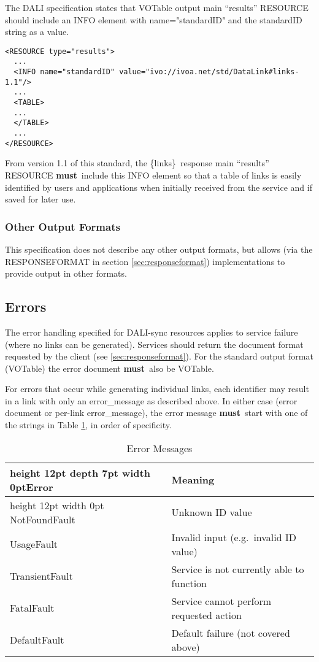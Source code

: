 \documentclass[11pt,a4paper]{ivoa}
\newcommand{\blinks}{\{links\}}
\newcommand{\attval}[2]{#1={\allowbreak}{"}#2{"}}
\newcommand{\rfcmust}{\textbf{must}}
\begin{document}
The DALI specification states that VOTable output main ``results'' RESOURCE should include an
INFO element with \attval{name}{standardID} and the standardID string as a value.
\begin{verbatim}
<RESOURCE type="results">
  ...
  <INFO name="standardID" value="ivo://ivoa.net/std/DataLink#links-1.1"/>
  ...
  <TABLE>
  ...
  </TABLE>
  ...
</RESOURCE>
\end{verbatim}
From version 1.1 of this standard, the \blinks\ response main ``results'' RESOURCE \rfcmust\ include this
INFO element so that a table of links is easily identified by users and applications
when initially received from the service and if saved for later use.

\subsubsection{Other Output Formats}

This specification does not describe any other output formats, but allows
(via the RESPONSEFORMAT in section \ref{sec:responseformat})
implementations to provide
output in other formats.


\subsection{Errors}

The error handling specified for DALI-sync resources applies
to service failure (where no links can be generated).
Services should return the
document format requested by the client (see \ref{sec:responseformat}).
For the standard
output format (VOTable) the error document \rfcmust\ also be VOTable.

For errors that occur while generating individual links, each
identifier may result in a link with only an error\_message
as described above.
In either case (error document or per-link error\_message),
the error message \rfcmust\ start with one of the strings in
Table \ref{tab:errors}, in order of specificity.
\begin{table}[ht]
\begin{center}
\begin{tabular}{|l|l|}
\hline
\vrule height 12pt depth 7pt width 0pt{\bf Error} & {\bf Meaning} \\
\hline
\vrule height 12pt width 0pt  NotFoundFault  & Unknown ID value    \\
UsageFault     & Invalid input (e.g.\ invalid ID value) \\
TransientFault & Service is not currently able to function \\
FatalFault     & Service cannot perform requested action \\
DefaultFault   & Default failure (not covered above) \\
\hline
\end{tabular}
\end{center}
\caption{Error Messages}
\label{tab:errors}
\end{table}
\end{document}
